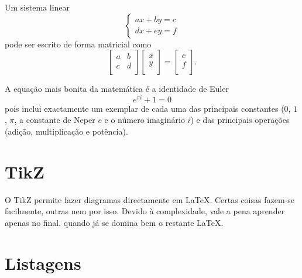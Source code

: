 \documentclass[11pt]{article}   %
\begin{document}
Um sistema linear
\[
    \begin{cases}
        ax + by = c \\
        dx + ey = f
    \end{cases}
\]
pode ser escrito de forma matricial como
\[
    \begin{bmatrix}
    a & b \\
    c & d \\
    \end{bmatrix}
    \begin{bmatrix}
    x \\
    y \\
    \end{bmatrix}
    =
    \begin{bmatrix}
    c \\
    f \\
    \end{bmatrix}.
\]

A equação mais bonita da matemática é a identidade de Euler
\begin{equation}
    e^{\pi i} + 1 = 0
\end{equation}
pois inclui exactamente um exemplar de cada uma das principais constantes ($0$, $1$, $\pi$, a constante de Neper $e$ e o número imaginário $i$) e das principais operações (adição, multiplicação e potência).

\section{TikZ}
\label{sec:tikz}

O TikZ permite fazer diagramas directamente em \LaTeX. Certas coisas fazem-se facilmente, outras nem por isso.
Devido à complexidade, vale a pena aprender apenas no final, quando já se domina bem o restante \LaTeX.
\begin{center}
\end{center}

\section{Listagens}
\label{sec:listagens}
\end{document}
